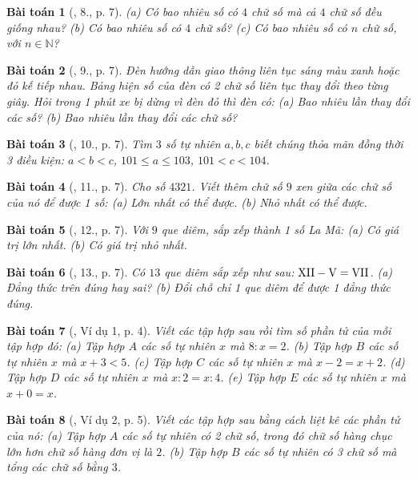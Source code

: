 \documentclass{article}
\newtheorem{baitoan}{Bài toán}
\begin{document}
\begin{baitoan}[\cite{Tuyen_Toan_6}, 8., p. 7]
	(a) Có bao nhiêu số có $4$ chữ số mà cả $4$ chữ số đều giống nhau? (b) Có bao nhiêu số có $4$ chữ số? (c) Có bao nhiêu số có $n$ chữ số, với $n\in\mathbb{N}$?
\end{baitoan}

\begin{baitoan}[\cite{Tuyen_Toan_6}, 9., p. 7]
	Đèn hướng dẫn giao thông liên tục sáng màu xanh hoặc đỏ kế tiếp nhau. Bảng hiện số của đèn có 2 chữ số liên tục thay đổi theo từng giây. Hỏi trong 1 phút xe bị dừng vì đèn đỏ thì đèn có: (a) Bao nhiêu lần thay đổi các số? (b) Bao nhiêu lần thay đổi các chữ số?
\end{baitoan}

\begin{baitoan}[\cite{Tuyen_Toan_6}, 10., p. 7]
	Tìm $3$ số tự nhiên $a,b,c$ biết chúng thỏa mãn đồng thời 3 điều kiện: $a < b < c$, $101\le a\le103$, $101 < c < 104$.
\end{baitoan}

\begin{baitoan}[\cite{Tuyen_Toan_6}, 11., p. 7]
	Cho số $4321$. Viết thêm chữ số $9$ xen giữa các chữ số của nó để được 1 số: (a) Lớn nhất có thể được. (b) Nhỏ nhất có thể được.
\end{baitoan}

\begin{baitoan}[\cite{Tuyen_Toan_6}, 12., p. 7]
	Với $9$ que diêm, sắp xếp thành 1 số La Mã: (a) Có giá trị lớn nhất. (b) Có giá trị nhỏ nhất.
\end{baitoan}

\begin{baitoan}[\cite{Tuyen_Toan_6}, 13., p. 7]
	Có $13$ que diêm sắp xếp như sau: $\rm XII - V = VII$. (a) Đẳng thức trên đúng hay sai? (b) Đổi chỗ chỉ 1 que diêm để được 1 đẳng thức đúng.
\end{baitoan}

\begin{baitoan}[\cite{Binh_Toan_6_tap_1}, Ví dụ 1, p. 4]
	Viết các tập hợp sau rồi tìm số phần tử của mỗi tập hợp đó: (a) Tập hợp $A$ các số tự nhiên $x$ mà $8:x = 2$. (b) Tập hợp $B$ các số tự nhiên $x$ mà $x + 3 < 5$. (c) Tập hợp $C$ các số tự nhiên $x$ mà $x - 2 = x + 2$. (d) Tập hợp $D$ các số tự nhiên $x$ mà $x:2 = x:4$. (e) Tập hợp $E$ các số tự nhiên $x$ mà $x + 0 = x$.
\end{baitoan}

\begin{baitoan}[\cite{Binh_Toan_6_tap_1}, Ví dụ 2, p. 5]
	Viết các tập hợp sau bằng cách liệt kê các phần tử của nó: (a) Tập hợp $A$ các số tự nhiên có 2 chữ số, trong đó chữ số hàng chục lớn hơn chữ số hàng đơn vị là $2$. (b) Tập hợp $B$ các số tự nhiên có 3 chữ số mà tổng các chữ số bằng $3$.
\end{baitoan}
\end{document}
